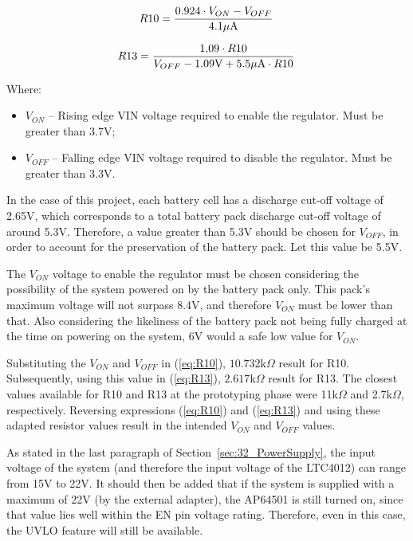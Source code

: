 \begin{equation}\label{eq:R10}
	R10 = \frac{0.924 \cdot V_{ON} - V_{OFF}}{4.1 \mu \textrm{A}}\,\medskip
\end{equation}

\begin{equation}\label{eq:R13}
	R13 = \frac{1.09 \cdot R10}{V_{OFF} - 1.09 \textrm{V} + 5.5 \mu \textrm{A} \cdot R10}\,\medskip
\end{equation}

Where:
\begin{itemize}
	\item $V_{ON}$ -- Rising edge VIN voltage required to enable the regulator. Must be greater than 3.7V;
	\item $V_{OFF}$ -- Falling edge VIN voltage required to disable the regulator. Must be greater than 3.3V.
\end{itemize}

In the case of this project, each battery cell has a discharge cut-off voltage of 2.65V, which corresponds to a total battery pack discharge cut-off voltage of around 5.3V. Therefore, a value greater than 5.3V should be chosen for $V_{OFF}$, in order to account for the preservation of the battery pack. Let this value be 5.5V.

The $V_{ON}$ voltage to enable the regulator must be chosen considering the possibility of the system powered on by the battery pack only. This pack's maximum voltage will not surpass 8.4V, and therefore $V_{ON}$ must be lower than that. Also considering the likeliness of the battery pack not being fully charged at the time on powering on the system, 6V would a safe low value for $V_{ON}$.

Substituting the $V_{ON}$ and $V_{OFF}$ in (\ref{eq:R10}), $10.732$k$\Omega$ result for R10. Subsequently, using this value in (\ref{eq:R13}), $2.617$k$\Omega$ result for R13. The closest values available for R10 and R13 at the prototyping phase were 11k$\Omega$ and 2.7k$\Omega$, respectively. Reversing expressions (\ref{eq:R10}) and (\ref{eq:R13}) and using these adapted resistor values result in the intended $V_{ON}$ and $V_{OFF}$ values.

As stated in the last paragraph of Section~\ref{sec:32_PowerSupply}, the input voltage of the system (and therefore the input voltage of the LTC4012) can range from 15V to 22V. It should then be added that if the system is supplied with a maximum of 22V (by the external adapter), the AP64501 is still turned on, since that value lies well within the EN pin voltage rating. Therefore, even in this case, the UVLO feature will still be available.

